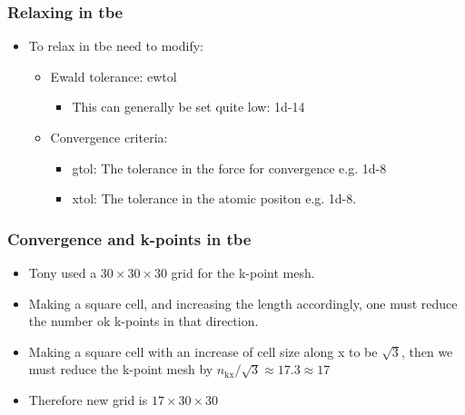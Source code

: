 \documentclass[11pt]{article}
\begin{document}
\subsubsection{Relaxing in tbe}
\label{sec-2-4-2}
\begin{itemize}
\item To relax in tbe need to modify:
\begin{itemize}
\item Ewald tolerance: ewtol
\begin{itemize}
\item This can generally be set quite low: 1d-14
\end{itemize}
\item Convergence criteria:
\begin{itemize}
\item gtol: The tolerance in the force for convergence e.g. 1d-8
\item xtol: The tolerance in the atomic positon e.g. 1d-8.
\end{itemize}
\end{itemize}
\end{itemize}

\subsubsection{Convergence and k-points in tbe}
\label{sec-2-4-3}
\begin{itemize}
\item Tony used a $30\times 30\times 30$ grid for the k-point mesh.
\item Making a square cell, and increasing the length accordingly, one must
reduce the number ok k-points in that direction.
\item Making a square cell with an increase of cell size along x to be
$\sqrt{3}$, then we must reduce the k-point mesh by $n_{\text{kx}} /
      \sqrt{3} \approx 17.3 \approx 17$
\item Therefore new grid is $17 \times 30 \times 30$
\end{itemize}
\end{document}
